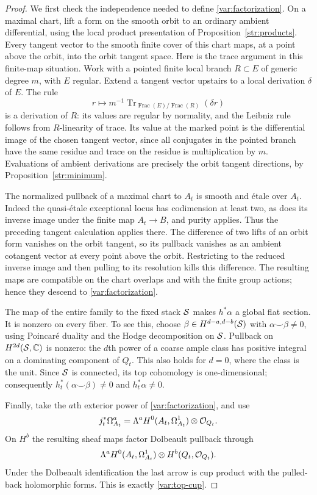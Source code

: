 \begin{proof}
We first check the independence needed to define
\eqref{var:factorization}.  On a maximal chart, lift a form on the
smooth orbit to an ordinary ambient differential, using the local
product presentation of Proposition~\ref{str:products}.  Every tangent
vector to the smooth finite cover of this chart maps, at a point above
the orbit, into the orbit tangent space.  Here is the trace argument
in this finite-map situation.  Work with a pointed finite local branch
$R\subset E$ of generic degree $m$, with $E$ regular.  Extend a tangent
vector upstairs to a local derivation $\delta$ of $E$.  The rule
\[
 r\longmapsto m^{-1}\operatorname{Tr}_{\operatorname{Frac}(E)/
                            \operatorname{Frac}(R)}(\delta r)
\]
is a derivation of $R$: its values are regular by normality, and the
Leibniz rule follows from $R$-linearity of trace.  Its value at the
marked point is the differential image of the chosen tangent vector,
since all conjugates in the pointed branch have the same residue and
trace on the residue is multiplication by $m$.  Evaluations of
ambient derivations are precisely the orbit tangent directions, by
Proposition~\ref{str:minimum}.

The normalized pullback of a maximal chart to $A_t$ is smooth and
\'etale over $A_t$.  Indeed the quasi-\'etale exceptional locus has
codimension at least two, as does its inverse image under the finite
map $A_t\to B$, and purity applies.  Thus the preceding tangent
calculation applies there.  The difference of two lifts of an orbit
form vanishes on the orbit tangent, so its pullback vanishes as an
ambient cotangent vector at every point above the orbit.  Restricting
to the reduced inverse image and then pulling to its resolution kills
this difference.  The resulting maps are compatible on the chart
overlaps and with the finite group actions; hence they descend to
\eqref{var:factorization}.

The map of the entire family to the fixed stack $\mathcal S$ makes $h^*\alpha$
a global flat section.  It is nonzero on every fiber.  To see this,
choose $\beta\in H^{d-a,d-b}(\mathcal S)$ with $\alpha\smile\beta\ne0$, using
Poincar\'e duality and the Hodge decomposition on $\mathcal S$.  Pullback on
$H^{2d}(\mathcal S,\mathbb C)$ is nonzero: the $d$th power of a coarse ample class
has positive integral on a dominating component of $Q_t$.  This also
holds for $d=0$, where the class is the unit.  Since $\mathcal S$ is connected,
its top cohomology is one-dimensional; consequently
$h_t^*(\alpha\smile\beta)\ne0$ and $h_t^*\alpha\ne0$.

Finally, take the $a$th exterior power of
\eqref{var:factorization}, and use
\[
 j_t^*\Omega^a_{A_t}
       =\Lambda^a H^0(A_t,\Omega^1_{A_t})\otimes\mathcal O_{Q_t}.
\]
On $H^b$ the resulting sheaf maps factor Dolbeault pullback through
\[
 \Lambda^a H^0(A_t,\Omega^1_{A_t})\otimes H^b(Q_t,\mathcal O_{Q_t}).
\]
Under the Dolbeault identification the last arrow is cup product
with the pulled-back holomorphic forms.  This is exactly
\eqref{var:top-cup}.
\end{proof}

